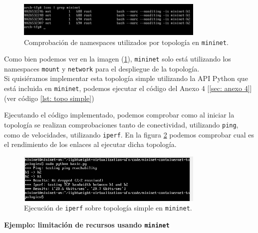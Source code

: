 \documentclass[a4paper, oneside, 12pt]{book}
\begin{document}
	\begin{figure}[h!]
		\begin{center}
			\includegraphics[width=0.8\textwidth]{img/mn_single_3.png}
			\caption{Comprobación de namespaces utilizados por topología en \texttt{mininet}.}
			\label{img: lsns mininet 1}	
		\end{center}
	\end{figure}

	\noindent Como bien podemos ver en la imagen (\ref{img: lsns mininet 1}), \texttt{mininet} solo está utilizando los namespaces \texttt{mount} y \texttt{network} para el despliegue de la topología. \\
	
	\noindent Si quisiéramos implementar esta topología simple utilizando la API Python que está incluida en \texttt{mininet}, podemos ejecutar el código del Anexo 4 [\ref{sec: anexo 4}] (ver código \ref{lst: topo simple})
	
	\pagebreak
	
	\noindent Ejecutando el código implementado, podemos comprobar como al iniciar la topología se realizan comprobaciones tanto de conectividad, utilizando \texttt{ping}, como de velocidades, utilizando \texttt{iperf}. En la figura \ref{img: iperf mn simple} podemos comprobar cual es el rendimiento de los enlaces al ejecutar dicha topología.
	
	\begin{figure}[h!]
		\begin{center}
			\includegraphics[width=0.8\textwidth]{img/mn_single_4.png}
			\caption{Ejecución de \texttt{iperf} sobre topología simple en \texttt{mininet}.}
			\label{img: iperf mn simple}	
		\end{center}
	\end{figure}
	
	
	\noindent \textbf{\large Ejemplo: limitación de recursos usando \texttt{mininet}}\\
	
\end{document}
